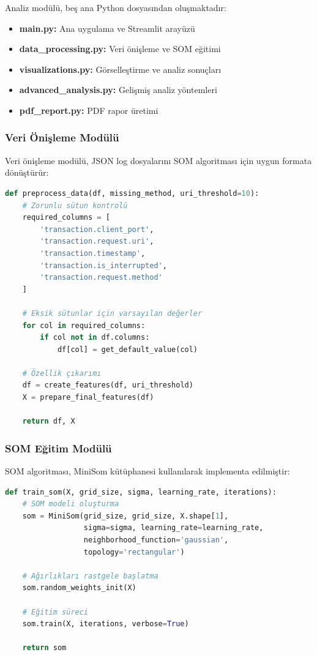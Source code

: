 Analiz modülü, beş ana Python dosyasından oluşmaktadır:

\begin{itemize}
    \item \textbf{main.py:} Ana uygulama ve Streamlit arayüzü
    \item \textbf{data\_processing.py:} Veri önişleme ve SOM eğitimi
    \item \textbf{visualizations.py:} Görselleştirme ve analiz sonuçları
    \item \textbf{advanced\_analysis.py:} Gelişmiş analiz yöntemleri
    \item \textbf{pdf\_report.py:} PDF rapor üretimi
\end{itemize}

\subsubsection{Veri Önişleme Modülü}

Veri önişleme modülü, JSON log dosyalarını SOM algoritması için uygun formata dönüştürür:

\begin{lstlisting}[language=python]
def preprocess_data(df, missing_method, uri_threshold=10):
    # Zorunlu sütun kontrolü
    required_columns = [
        'transaction.client_port',
        'transaction.request.uri',
        'transaction.timestamp',
        'transaction.is_interrupted',
        'transaction.request.method'
    ]
    
    # Eksik sütunlar için varsayılan değerler
    for col in required_columns:
        if col not in df.columns:
            df[col] = get_default_value(col)
    
    # Özellik çıkarımı
    df = create_features(df, uri_threshold)
    X = prepare_final_features(df)
    
    return df, X
\end{lstlisting}

\newpage

\subsubsection{SOM Eğitim Modülü}

SOM algoritması, MiniSom kütüphanesi kullanılarak implementa edilmiştir:

\begin{lstlisting}[language=python]
def train_som(X, grid_size, sigma, learning_rate, iterations):
    # SOM modeli oluşturma
    som = MiniSom(grid_size, grid_size, X.shape[1], 
                  sigma=sigma, learning_rate=learning_rate,
                  neighborhood_function='gaussian',
                  topology='rectangular')
    
    # Ağırlıkları rastgele başlatma
    som.random_weights_init(X)
    
    # Eğitim süreci
    som.train(X, iterations, verbose=True)
    
    return som
\end{lstlisting}


